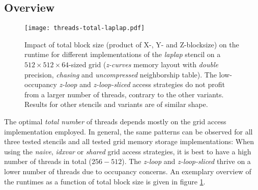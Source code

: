 \subsection{Overview}

\begin{figure}
	\begin{center}
    \texttt{[image: threads-total-laplap.pdf]}
	\end{center}
    \caption{\label{fig:blocksizes-overview} Impact of total block size (product of X-, Y- and Z-blocksize) on the runtime for different implementations of the \emph{laplap} stencil on a $512\times 512\times 64$-sized grid (\emph{z-curves} memory layout with \emph{double} precision, \emph{chasing} and \emph{uncompressed} neighborship table). The low-occupancy \emph{z-loop} and \emph{z-loop-sliced} access strategies do not profit from a larger number of threads, contrary to the other variants. Results for other stencils and variants are of similar shape.}
\end{figure}

The optimal \emph{total number} of threads depends mostly on the grid access implementation employed. In general, the same patterns can be observed for all three tested stencils and all tested grid memory storage implementations: When using the \emph{naive}, \emph{idxvar} or \emph{shared} grid access strategies, it is best to have a high number of threads in total ($256-512$). The \emph{z-loop} and \emph{z-loop-sliced} thrive on a lower number of threads due to occupancy concerns. An exemplary overview of the runtimes as a function of total block size is given in figure \ref{fig:blocksizes-overview}.

